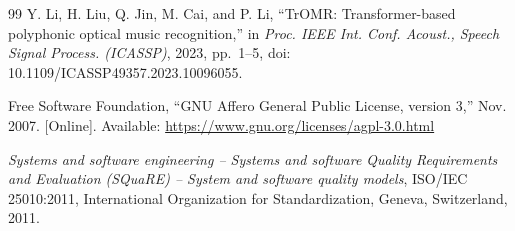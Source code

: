 \documentclass[conference]{IEEEtran}
\begin{document}
\begin{thebibliography}{99}
Y. Li, H. Liu, Q. Jin, M. Cai, and P. Li, ``TrOMR: Transformer-based
polyphonic optical music recognition,'' in \emph{Proc. IEEE Int. Conf.
Acoust., Speech Signal Process. (ICASSP)}, 2023, pp.~1--5,
doi: 10.1109/ICASSP49357.2023.10096055. %

Free Software Foundation, ``GNU Affero General Public License, version 3,''
Nov. 2007. [Online]. Available: \url{https://www.gnu.org/licenses/agpl-3.0.html} %

\emph{Systems and software engineering -- Systems and software Quality
Requirements and Evaluation (SQuaRE) -- System and software quality models},
ISO/IEC 25010:2011, International Organization for Standardization, Geneva,
Switzerland, 2011. %

\end{thebibliography}
\end{document}
